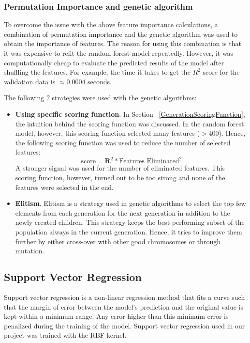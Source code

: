 \documentclass[11pt]{article}
\begin{document}
\subsubsection{Permutation Importance and genetic algorithm}
To overcome the issue with the above feature importance calculations, a combination of permutation importance and the genetic algorithm was used to obtain the importance of features.
The reason for using this combination is that it was expensive to refit the random forest model repeatedly. However, it was computationally cheap to evaluate the predicted results of the model after shuffling the features.
For example,  the time it takes to get the $R^2$ score for the validation data is $\approx 0.0004$ seconds.

The following 2 strategies were used with the genetic algorithms:
\begin{itemize}
\item \textbf{Using specific scoring function}.  In Section ~\ref{GenerationScoringFunction},  the intuition behind the scoring function was discussed.
In the random forest model,  however,  this scoring function selected many features ($> 400$). Hence, the following scoring function was used to reduce the number of selected features:
$$
\textrm{score} = \mathbf{R}^2 * \textrm{Features Eliminated}^2
$$
A stronger signal was used for the number of eliminated features. This scoring function, however,  turned out to be too strong and none of the features were selected in the end.
\item \textbf{Elitism}.  Elitism is a strategy used in genetic algorithms to select the top few elements from each generation for the next generation in addition to the newly created children. This strategy keeps the best performing subset of the population always in the current generation. Hence, it tries to improve them further by either cross-over with other good chromosomes or through mutation.
\end{itemize}


\subsection{Support Vector Regression}
Support vector regression is a non-linear regression method that fits a curve such that the margin of error between the model's prediction and the original value is kept within a minimum range.
Any error higher than this minimum error is penalized during the training of the model.
Support vector regression used in our project was trained with the RBF kernel.
\end{document}
